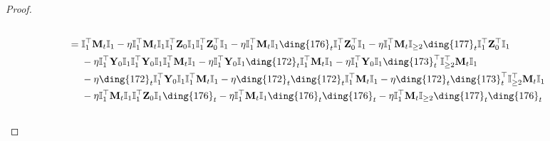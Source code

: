 \documentclass{article}
\theoremstyle{plain}
\theoremstyle{remark}
\def\bY{\mathbf{Y}}
\def\bZ{\mathbf{Z}}
\newcommand{\cc}[1]{\text{\ding{\number\numexpr#1 + 171\relax}}}
\begin{document}
\begin{proof}
\begin{align*}
        \\
        &=
            \mathbb{I}_{1}^\top\mathbf{M}_{t} \mathbb{I}_{1}
            - \eta\mathbb{I}_{1}^\top \mathbf{M}_{t}\mathbb{I}_{1}\mathbb{I}_{1}^\top\bZ_0\mathbb{I}_{1}\mathbb{I}_{1}^\top \bZ_0^\top\mathbb{I}_{1}
            - \eta\mathbb{I}_{1}^\top \mathbf{M}_{t}\mathbb{I}_{1}\cc{5}_t\mathbb{I}_{1}^\top \bZ_0^\top\mathbb{I}_{1}
            - \eta\mathbb{I}_{1}^\top \mathbf{M}_{t}\mathbb{I}_{\ge2}\cc{6}_t\mathbb{I}_{1}^\top \bZ_0^\top\mathbb{I}_{1}
        \\
        &~~~~ 
            - \eta \mathbb{I}_{1}^\top \bY_0 \mathbb{I}_{1}\mathbb{I}_{1}^\top \bY_0\mathbb{I}_{1}\mathbb{I}_{1}^\top\mathbf{M}_{t} \mathbb{I}_{1} 
            - \eta \mathbb{I}_{1}^\top \bY_0 \mathbb{I}_{1}\cc{1}_t\mathbb{I}_{1}^\top\mathbf{M}_{t} \mathbb{I}_{1}
            - \eta \mathbb{I}_{1}^\top \bY_0 \mathbb{I}_{1}\cc{2}_t^\top\mathbb{I}_{\ge2}^\top\mathbf{M}_{t} \mathbb{I}_{1}
        \\
        &~~~~ 
            - \eta \cc{1}_t\mathbb{I}_{1}^\top \bY_0\mathbb{I}_{1}\mathbb{I}_{1}^\top\mathbf{M}_{t} \mathbb{I}_{1} 
            - \eta \cc{1}_t\cc{1}_t\mathbb{I}_{1}^\top\mathbf{M}_{t} \mathbb{I}_{1}
            - \eta \cc{1}_t\cc{2}_t^\top\mathbb{I}_{\ge2}^\top\mathbf{M}_{t} \mathbb{I}_{1}
        \\
        &~~~~ 
            - \eta\mathbb{I}_{1}^\top \mathbf{M}_{t}\mathbb{I}_{1}\mathbb{I}_{1}^\top\bZ_0\mathbb{I}_{1}\cc{5}_t 
            - \eta\mathbb{I}_{1}^\top \mathbf{M}_{t}\mathbb{I}_{1}\cc{5}_t\cc{5}_t 
            - \eta\mathbb{I}_{1}^\top \mathbf{M}_{t}\mathbb{I}_{\ge2}\cc{6}_t\cc{5}_t 
        \\
        &~~~~ 

\end{align*}
\end{proof}
\end{document}
